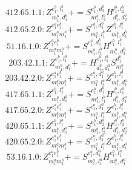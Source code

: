 \documentclass[letterpaper,10pt,fleqn,leqno,onecolumn]{article}
\begin{document}
\begin{equation} \;\;\;\;\;\;  412.65.1.1: Z^{e_{1}^{b},l_{1}^{b}}_{m_{1}^{b},d_{1}^{b}}+=S^{e_{1}^{b},d_{2}^{b}}_{m_{1}^{b},l_{2}^{b}}H^{l_{1}^{b},l_{2}^{b}}_{d_{1}^{b},d_{2}^{b}} \end{equation}
\begin{equation} \;\;\;\;\;\;  412.65.2.0: Z^{e_{1}^{a}e_{1}^{b}}_{m_{1}^{a}m_{1}^{b}}+=S^{e_{1}^{a},d_{1}^{b}}_{m_{1}^{a},l_{1}^{b}}Z^{e_{1}^{b},l_{1}^{b}}_{m_{1}^{b},d_{1}^{b}} \end{equation}
\begin{equation} \;\;\;\;\;\;  51.16.1.0: Z^{e_{1}^{a}e_{1}^{b}}_{m_{1}^{a}m_{1}^{b}}+=S^{e_{1}^{a},d_{1}^{b}}_{m_{1}^{a},l_{1}^{b}}H^{e_{1}^{b},l_{1}^{b}}_{m_{1}^{b},d_{1}^{b}} \end{equation}
\begin{equation} \;\;\;\;\;\;  203.42.1.1: Z^{e_{1}^{b},l_{1}^{a}}_{m_{1}^{b},d_{1}^{a}}+=H^{e_{1}^{b},l_{1}^{a}}_{d_{1}^{b},d_{1}^{a}}S^{d_{1}^{b}}_{m_{1}^{b}} \end{equation}
\begin{equation} \;\;\;\;\;\;  203.42.2.0: Z^{e_{1}^{a}e_{1}^{b}}_{m_{1}^{a}m_{1}^{b}}+=S^{e_{1}^{a},d_{1}^{a}}_{m_{1}^{a},l_{1}^{a}}Z^{e_{1}^{b},l_{1}^{a}}_{m_{1}^{b},d_{1}^{a}} \end{equation}
\begin{equation} \;\;\;\;\;\;  417.65.1.1: Z^{e_{1}^{b},l_{1}^{a}}_{m_{1}^{b},d_{1}^{a}}+=S^{e_{1}^{b},d_{1}^{b}}_{m_{1}^{b},l_{1}^{b}}H^{l_{1}^{b},l_{1}^{a}}_{d_{1}^{b},d_{1}^{a}} \end{equation}
\begin{equation} \;\;\;\;\;\;  417.65.2.0: Z^{e_{1}^{a}e_{1}^{b}}_{m_{1}^{a}m_{1}^{b}}+=S^{e_{1}^{a},d_{1}^{a}}_{m_{1}^{a},l_{1}^{a}}Z^{e_{1}^{b},l_{1}^{a}}_{m_{1}^{b},d_{1}^{a}} \end{equation}
\begin{equation} \;\;\;\;\;\;  420.65.1.1: Z^{e_{1}^{b},l_{1}^{a}}_{m_{1}^{b},d_{1}^{a}}+=S^{e_{1}^{b},d_{2}^{a}}_{m_{1}^{b},l_{2}^{a}}H^{l_{1}^{a},l_{2}^{a}}_{d_{1}^{a},d_{2}^{a}} \end{equation}
\begin{equation} \;\;\;\;\;\;  420.65.2.0: Z^{e_{1}^{a}e_{1}^{b}}_{m_{1}^{a}m_{1}^{b}}+=S^{e_{1}^{a},d_{1}^{a}}_{m_{1}^{a},l_{1}^{a}}Z^{e_{1}^{b},l_{1}^{a}}_{m_{1}^{b},d_{1}^{a}} \end{equation}
\begin{equation} \;\;\;\;\;\;  53.16.1.0: Z^{e_{1}^{a}e_{1}^{b}}_{m_{1}^{a}m_{1}^{b}}+=S^{e_{1}^{a},d_{1}^{a}}_{m_{1}^{a},l_{1}^{a}}H^{e_{1}^{b},l_{1}^{a}}_{m_{1}^{b},d_{1}^{a}} \end{equation}
\end{document}
